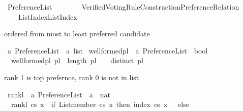 %
\begin{isabellebody}%
%
%
\isadelimtheory
%
\endisadelimtheory
%
\isatagtheory
{}\isamarkupfalse%
\ Preference{\isacharunderscore}{\kern0pt}List\isanewline
\ \ \ \isanewline
\ \ \ \ {\isachardoublequoteopen}Verified{\isacharunderscore}{\kern0pt}Voting{\isacharunderscore}{\kern0pt}Rule{\isacharunderscore}{\kern0pt}Construction{\isachardot}{\kern0pt}Preference{\isacharunderscore}{\kern0pt}Relation{\isachardoublequoteclose}\isanewline
\ \ \ \ {\isachardoublequoteopen}List{\isacharminus}{\kern0pt}Index{\isachardot}{\kern0pt}List{\isacharunderscore}{\kern0pt}Index{\isachardoublequoteclose}\isanewline
{}%
\endisatagtheory
{\isafoldtheory}%
%
\isadelimtheory
%
\endisadelimtheory
%
\begin{isamarkuptext}%
ordered from most to least preferred candidate%
\end{isamarkuptext}\isamarkuptrue%
\isamarkupfalse%
\ {\isacharprime}{\kern0pt}a\ Preference{\isacharunderscore}{\kern0pt}List\ {\isacharequal}{\kern0pt}\ {\isachardoublequoteopen}{\isacharprime}{\kern0pt}a\ list{\isachardoublequoteclose}\isanewline
\isanewline
{}\isamarkupfalse%
\ well{\isacharunderscore}{\kern0pt}formed{\isacharunderscore}{\kern0pt}pl\ {\isacharcolon}{\kern0pt}{\isacharcolon}{\kern0pt}\ {\isachardoublequoteopen}{\isacharprime}{\kern0pt}a\ Preference{\isacharunderscore}{\kern0pt}List\ {\isasymRightarrow}\ bool{\isachardoublequoteclose}\ \isanewline
\ \ {\isachardoublequoteopen}well{\isacharunderscore}{\kern0pt}formed{\isacharunderscore}{\kern0pt}pl\ pl\ {\isasymequiv}\ length\ pl\ {\isachargreater}{\kern0pt}\ {}\ {\isasymand}\ distinct\ pl{\isachardoublequoteclose}%
\begin{isamarkuptext}%
rank 1 is top prefernce, rank 0 is not in list%
\end{isamarkuptext}\isamarkuptrue%
\isamarkupfalse%
\ rank{\isacharunderscore}{\kern0pt}l\ {\isacharcolon}{\kern0pt}{\isacharcolon}{\kern0pt}\ {\isachardoublequoteopen}{\isacharprime}{\kern0pt}a\ Preference{\isacharunderscore}{\kern0pt}List\ {\isasymRightarrow}\ {\isacharprime}{\kern0pt}a\ {\isasymRightarrow}\ nat{\isachardoublequoteclose}\ \isanewline
\ \ {\isachardoublequoteopen}rank{\isacharunderscore}{\kern0pt}l\ cs\ x\ {\isacharequal}{\kern0pt}\ {\isacharparenleft}{\kern0pt}if\ {\isacharparenleft}{\kern0pt}List{\isachardot}{\kern0pt}member\ cs\ x{\isacharparenright}{\kern0pt}\ then\ index\ cs\ x\ {\isacharplus}{\kern0pt}\ {}\ else\ {}{\isacharparenright}{\kern0pt}{\isachardoublequoteclose}\isanewline

\end{isabellebody}
